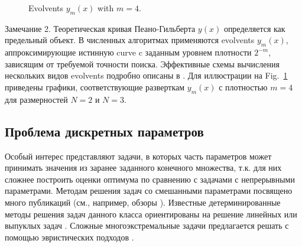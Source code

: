 \documentclass[preprint,12pt]{elsarticle}
\begin{document}
\begin{figure}
\begin{minipage}{0.45\linewidth}
\end{minipage}
\caption{Evolvents $y_m(x)$ with $m=4$.}\label{fig:Peano}
\end{figure}   

Замечание 2. Теоретическая кривая Пеано-Гильберта $y(x)$ определяется как предельный объект. В численных алгоритмах применяются evolvents $y_m(x)$, аппроксимирующие истинную curve c заданным уровнем плотности $2^{-m}$, зависящим от требуемой точности поиска. Эффективные схемы вычисления нескольких видов evolvents подробно описаны в \cite{Sergeyev2013}.
Для иллюстрации на Fig.~\ref{fig:Peano} приведены графики, соответствующие разверткам $y_m(x)$ с плотностью $m=4$ для размерностей $N=2$ и $N=3$. 


\subsection{Проблема дискретных параметров}
\label{sec_discr} 

Особый интерес представляют задачи, в которых часть параметров может принимать значения из заранее заданного конечного множества, т.к. для них сложнее построить оценки оптимума по сравнению с задачами с непрерывными параметрами.
Методам решения задач со смешанными параметрами посвящено много публикаций (см., например, обзоры \cite{Burer2012,Boukouvala2016}). 
Известные детерминированные методы решения задач данного класса ориентированы на решение линейных или выпуклых задач \cite{Lee2012}.
Сложные многоэкстремальные задачи предлагается решать с помощью эвристических подходов \cite{Belotti2013}.
\end{document}
